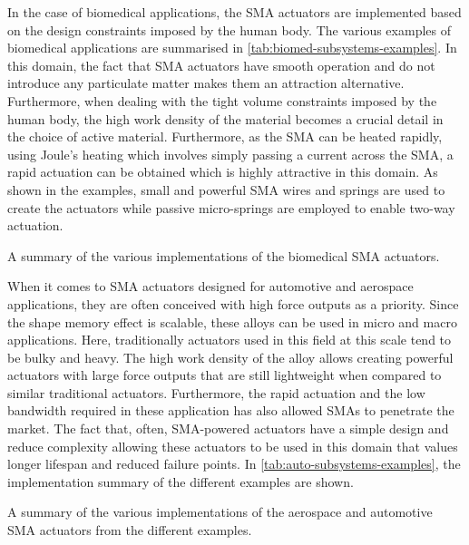 In the case of biomedical applications, the SMA actuators are implemented based on the design constraints imposed by the human body. The various examples of biomedical applications are summarised in \cref{tab:biomed-subsystems-examples}. In this domain, the fact that SMA actuators have smooth operation and do not introduce any particulate matter makes them an attraction alternative. Furthermore, when dealing with the tight volume constraints imposed by the human body, the high work density of the material becomes a crucial detail in the choice of active material. Furthermore, as the SMA can be heated rapidly, using Joule's heating which involves simply passing a current across the SMA, a rapid actuation can be obtained which is highly attractive in this domain. As shown in the examples, small and powerful SMA wires and springs are used to create the actuators while passive micro-springs are employed to enable two-way actuation.

\begin{table}[hbt]
    \centering
    \caption{A summary of the various implementations of the biomedical SMA actuators.}
    
    \label{tab:biomed-subsystems-examples}
\end{table}

When it comes to SMA actuators designed for automotive and aerospace applications, they are often conceived with high force outputs as a priority. Since the shape memory effect is scalable, these alloys can be used in micro and macro applications. Here, traditionally actuators used in this field at this scale tend to be bulky and heavy. The high work density of the alloy allows creating powerful actuators with large force outputs that are still lightweight when compared to similar traditional actuators. Furthermore, the rapid actuation and the low bandwidth required in these application has also allowed SMAs to penetrate the market. The fact that, often, SMA-powered actuators have a simple design and reduce complexity allowing these actuators to be used in this domain that values longer lifespan and reduced failure points. In \cref{tab:auto-subsystems-examples}, the implementation summary of the different examples are shown.

\begin{table}[hbt]
    \centering
    \caption{A summary of the various implementations of the aerospace and automotive SMA actuators from the different examples.}
    
    \label{tab:auto-subsystems-examples}
\end{table}

